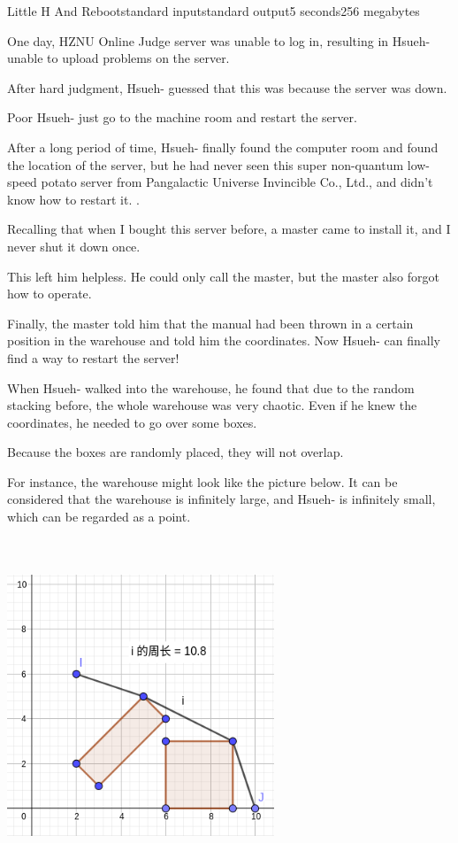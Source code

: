 \begin{problem}{Little H And Reboot}{standard input}{standard output}{5 seconds}{256 megabytes}

One day, HZNU Online Judge server was unable to log in, resulting in Hsueh- unable to upload problems on the server.

After hard judgment, Hsueh- guessed that this was because the server was down.


Poor Hsueh- just go to the machine room and restart the server.

After a long period of time, Hsueh- finally found the computer room and found the location of the server, but he had never seen this super non-quantum low-speed potato server from Pangalactic Universe Invincible Co., Ltd., and didn't know how to restart it. .

Recalling that when I bought this server before, a master came to install it, and I never shut it down once.

This left him helpless. He could only call the master, but the master also forgot how to operate.

Finally, the master told him that the manual had been thrown in a certain position in the warehouse and told him the coordinates. Now Hsueh- can finally find a way to restart the server!

When Hsueh- walked into the warehouse, he found that due to the random stacking before, the whole warehouse was very chaotic. Even if he knew the coordinates, he needed to go over some boxes.

Because the boxes are randomly placed, they will not overlap.

For instance, the warehouse might look like the picture below. It can be considered that the warehouse is infinitely large, and Hsueh- is infinitely small, which can be regarded as a point.

\begin{center}
\includegraphics[width=8cm,height=10cm,natwidth=320,natheight=360]{data1.png} %
\end{center}



\end{problem}
